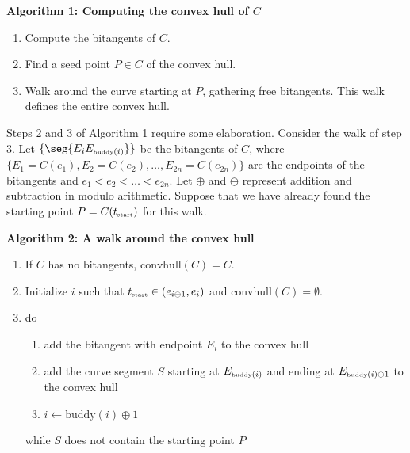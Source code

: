 \documentclass[12pt]{article}
\begin{document}
\vspace{.2in}

\centerline{{\bf Algorithm 1: Computing the convex hull of $C$}}

\begin{enumerate}
\item Compute the bitangents of $C$.
\item Find a seed point $P \in C$ of the convex hull.
\item Walk around the curve starting at $P$, gathering free bitangents.
	This walk defines the entire convex hull.
\end{enumerate}

Steps 2 and 3 of Algorithm 1 require some elaboration.
Consider the walk of step 3.
Let $\{\seg{E_i E_{\mbox{\tiny{buddy}}(i)}}\}$ be the bitangents of $C$,
where $\{E_1 = C(e_1), E_2 = C(e_2), \ldots, E_{2n} = C(e_{2n})\}$
are the endpoints of the bitangents
and $e_1 < e_2 < \ldots < e_{2n}$.
Let $\oplus$ and $\ominus$ represent 
addition and subtraction in modulo arithmetic.
Suppose that we have already found the starting point $P = C(t_{\mbox{\tiny{start}}})$
for this walk.

\vspace{.2in}

\centerline{{\bf Algorithm 2: A walk around the convex hull}}

\begin{enumerate}
\item 	If $C$ has no bitangents, $\mbox{convhull}(C) = C$.
\item	Initialize $i$ such that $t_{\mbox{\tiny{start}}} \in (e_{i \ominus 1}, e_i)$
	and $\mbox{convhull}(C) = \emptyset$.
\clearpage
\item	do
\begin{enumerate}
\item	%
	add the bitangent with endpoint $E_i$ to the convex hull
\item	%
	add the curve segment $S$ starting at $E_{\mbox{\tiny{buddy}}(i)}$
	and ending at $E_{\mbox{\tiny{buddy}}(i) \oplus 1}$
	to the convex hull
\item	$i \leftarrow \mbox{buddy}(i) \oplus 1$
\end{enumerate}
 	while $S$ does not contain the starting point $P$
\end{enumerate}
\end{document}

